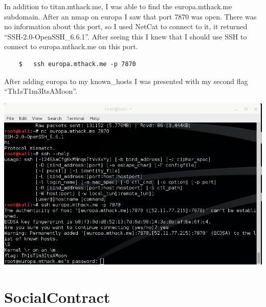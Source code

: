 \documentclass[12pt]{report}
\begin{document}
In addition to titan.mthack.me, I was able to find the europa.mthack.me subdomain. After an nmap on europa I saw that port 7870 was open. There was no information about this port, so I used NetCat to connect to it, it returned ``SSH-2.0-OpenSSH\_6.6.1''. After seeing this I knew that I should use SSH to connect to europa.mthack.me on this port.
	\begin{verbatim}
	$	ssh europa.mthack.me -p 7870
	\end{verbatim}
After adding europa to my known\_hosts I was presented with my second flag ``Th1sT1m3ItsAMoon''.\\
\newline
\begin{center}
\includegraphics[scale=0.33]{Th1sT1m3ItsAMoon.png}
\end{center}
\section{SocialContract}
\end{document}
